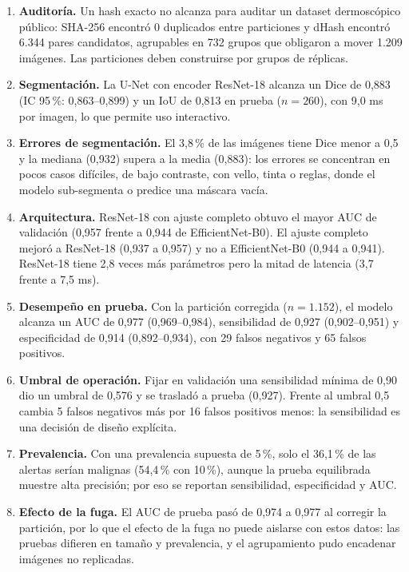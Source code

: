 \documentclass[conference]{IEEEtran}
\begin{document}
	\begin{enumerate}
		\item \textbf{Auditoría.} Un hash exacto no alcanza para auditar un dataset dermoscópico público: SHA-256 encontró 0 duplicados entre particiones y dHash encontró 6.344 pares candidatos, agrupables en 732 grupos que obligaron a mover 1.209 imágenes. Las particiones deben construirse por grupos de réplicas.
		\item \textbf{Segmentación.} La U-Net con encoder ResNet-18 alcanza un Dice de 0,883 (IC 95\,\%: 0,863--0,899) y un IoU de 0,813 en prueba ($n = 260$), con 9,0 ms por imagen, lo que permite uso interactivo.
		\item \textbf{Errores de segmentación.} El 3,8\,\% de las imágenes tiene Dice menor a 0,5 y la mediana (0,932) supera a la media (0,883): los errores se concentran en pocos casos difíciles, de bajo contraste, con vello, tinta o reglas, donde el modelo sub-segmenta o predice una máscara vacía.
		\item \textbf{Arquitectura.} ResNet-18 con ajuste completo obtuvo el mayor AUC de validación (0,957 frente a 0,944 de EfficientNet-B0). El ajuste completo mejoró a ResNet-18 (0,937 a 0,957) y no a EfficientNet-B0 (0,944 a 0,941). ResNet-18 tiene 2,8 veces más parámetros pero la mitad de latencia (3,7 frente a 7,5 ms).
		\item \textbf{Desempeño en prueba.} Con la partición corregida ($n = 1.152$), el modelo alcanza un AUC de 0,977 (0,969--0,984), sensibilidad de 0,927 (0,902--0,951) y especificidad de 0,914 (0,892--0,934), con 29 falsos negativos y 65 falsos positivos.
		\item \textbf{Umbral de operación.} Fijar en validación una sensibilidad mínima de 0,90 dio un umbral de 0,576 y se trasladó a prueba (0,927). Frente al umbral 0,5 cambia 5 falsos negativos más por 16 falsos positivos menos: la sensibilidad es una decisión de diseño explícita.
		\item \textbf{Prevalencia.} Con una prevalencia supuesta de 5\,\%, solo el 36,1\,\% de las alertas serían malignas (54,4\,\% con 10\,\%), aunque la prueba equilibrada muestre alta precisión; por eso se reportan sensibilidad, especificidad y AUC.
		\item \textbf{Efecto de la fuga.} El AUC de prueba pasó de 0,974 a 0,977 al corregir la partición, por lo que el efecto de la fuga no puede aislarse con estos datos: las pruebas difieren en tamaño y prevalencia, y el agrupamiento pudo encadenar imágenes no replicadas.
	\end{enumerate}
	
\end{document}
